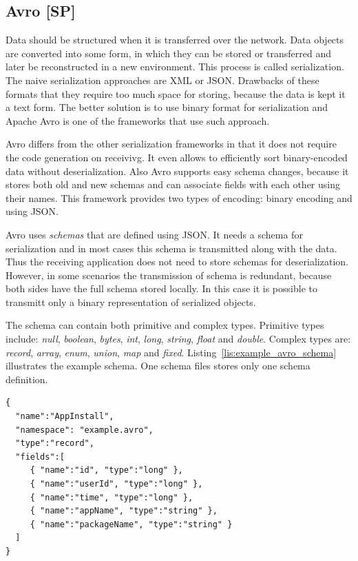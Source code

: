 \subsection{Avro [SP]}

Data should be structured when it is transferred over the network.
Data objects are converted into some form, in which they can be stored or transferred and later be reconstructed in a new environment.
This process is called serialization.
The naive serialization approaches are XML or JSON.
Drawbacks of these formats that they require too much space for storing, because the data is kept it a text form.
The better solution is to use binary format for serialization and Apache Avro is one of the frameworks that use such approach.

Avro differs from the other serialization frameworks in that it does not require the code generation on receivivg.
It even allows to efficiently sort binary-encoded data without deserialization.
Also Avro supports easy schema changes, because it stores both old and new schemas and can associate fields with each other using their names.
This framework provides two types of encoding: binary encoding and using JSON.

Avro uses \textit{schemas} that are defined using JSON.
It needs a schema for serialization and in most cases this schema is transmitted along with the data.
Thus the receiving application does not need to store schemas for deserialization.
However, in some scenarios the transmission of schema is redundant, because both sides have the full schema stored locally.
In this case it is possible to transmitt only a binary representation of serialized objects.

The schema can contain both primitive and complex types.
Primitive types include: \textit{null}, \textit{boolean}, \textit{bytes}, \textit{int}, \textit{long}, \textit{string}, \textit{float} and \textit{double}.
Complex types are: \textit{record}, \textit{array}, \textit{enum}, \textit{union}, \textit{map} and \textit{fixed}.
Listing~\ref{lis:example_avro_schema} illustrates the example schema.
One schema files stores only one schema definition.

\begin{lstlisting}[caption=Avro schema (example), label=lis:example_avro_schema]
{
  "name":"AppInstall",
  "namespace": "example.avro",
  "type":"record",
  "fields":[
     { "name":"id", "type":"long" },
     { "name":"userId", "type":"long" },
     { "name":"time", "type":"long" },
     { "name":"appName", "type":"string" },
     { "name":"packageName", "type":"string" }
  ]
}
\end{lstlisting}

